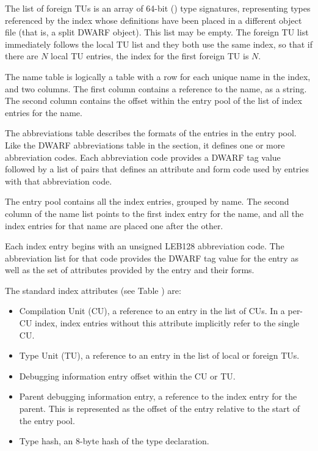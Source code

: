 The list of foreign TUs is an array of 64-bit (\DWFORMrefsigeight) type
signatures, representing types referenced by the index whose
definitions have been placed in a different object file (that is, a split
DWARF object). This list may be empty. 
The foreign TU list immediately follows the local TU list 
and they both use the same index, so that if there are $N$ local TU entries, 
the index for the first foreign TU is $N$.

The name table is logically a table with a row for each unique name in
the index, and two columns. The first column contains a reference to
the name, as a string. The second column contains the offset within
the entry pool of the list of index entries for the name.

The abbreviations table describes the formats of the entries in the
entry pool. Like the DWARF abbreviations table in the \dotdebugabbrev{}
section, it defines one or more abbreviation codes. Each abbreviation
code provides a DWARF tag value followed by a list of pairs that
defines an attribute and form code used by entries with that
abbreviation code.

The entry pool contains all the index entries, grouped by name. The
second column of the name list points to the first index entry for the
name, and all the index entries for that name are placed one after the
other.

Each index entry begins with an unsigned LEB128 abbreviation code.
The  abbreviation list for that code provides the DWARF tag value for
the entry as well as the set of attributes provided by the entry and
their forms.

The standard 
\bb
index attributes (see Table )
\eb 
are:
\begin{itemize}
\item Compilation Unit (CU), a reference to an entry in the list of
    CUs. In a per-CU index, index entries without this attribute
    implicitly refer to the single CU.

\item Type Unit (TU), a reference to an entry in the list of local
    or foreign TUs.

\item Debugging information entry offset within the CU or TU.

\item Parent debugging information entry, 
    a reference to the index entry for the parent.
    This is represented as the offset of the entry relative to
    the start of the entry pool.

\item Type hash, an 8-byte hash of the type declaration.

\end{itemize}

